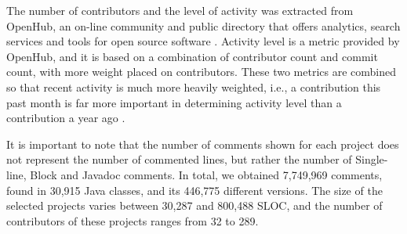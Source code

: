 The number of contributors and the level of activity was extracted from OpenHub, an on-line community and public directory that offers analytics, search services and tools for open source software \cite{Openhub:home}. Activity level is a metric provided by OpenHub, and it is based on a combination of contributor count and commit count, with more weight placed on contributors. These two metrics are combined so that recent activity is much more heavily weighted, i.e., a contribution this past month is far more important in determining activity level than a contribution a year ago \cite{Openhub:activity_level}. 

It is important to note that the number of comments shown for each project does not represent the number of commented lines, but rather the number of Single-line, Block and Javadoc comments. In total, we obtained 7,749,969 comments, found in 30,915 Java classes, and its 446,775 different versions. The size of the selected projects varies between 30,287 and 800,488 SLOC, and the number of contributors of these projects ranges from 32 to 289. 

